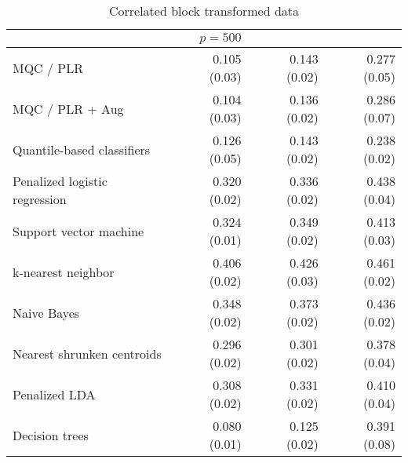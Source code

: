 \begin{table}[p]
\begin{adjustbox}{max size={\textwidth}{10cm}}
\begin{tabular}{l@{\extracolsep{15mm}}rrr}
      \hline
      & $p = 500$ \\
      \hline

      MQC / PLR & 0.105 (0.03) & 0.143 (0.02) & 0.277 (0.05) \\ 
      MQC / PLR + Aug & 0.104 (0.03) & 0.136 (0.02) & 0.286 (0.07) \\ 
      Quantile-based classifiers & 0.126 (0.05) & 0.143 (0.02) & 0.238 (0.02) \\ 
      Penalized logistic regression & 0.320 (0.02) & 0.336 (0.02) & 0.438 (0.04) \\ 
      Support vector machine & 0.324 (0.01) & 0.349 (0.02) & 0.413 (0.03) \\ 
      k-nearest neighbor & 0.406 (0.02) & 0.426 (0.03) & 0.461 (0.02) \\ 
      Naive Bayes & 0.348 (0.02) & 0.373 (0.02) & 0.436 (0.02) \\ 
      Nearest shrunken centroids & 0.296 (0.02) & 0.301 (0.02) & 0.378 (0.04) \\ 
      Penalized LDA & 0.308 (0.02) & 0.331 (0.02) & 0.410 (0.04) \\ 
      Decision trees & 0.080 (0.01) & 0.125 (0.02) & 0.391 (0.08) \\
      \hline
      
    \end{tabular}
  \end{adjustbox}
  \caption{Correlated block transformed data}
\end{table}




